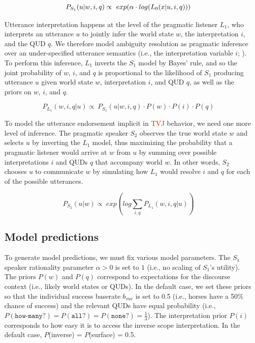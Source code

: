 \documentclass[preprint,authoryear]{elsarticle}\frenchspacing
\newcommand{\lp}[1]{\textcolor{red}{#1}} %
\begin{document}
\begin{equation*}
P_{S_{1}} (u | w, i, q) \propto  \ exp (\alpha \cdot log(L_{0}(x | u, i, q)))\\
\end{equation*}

Utterance interpretation happens at the level of the pragmatic listener $L_1$, who interprets an utterance $u$ to jointly infer the world state $w$, the interpretation $i$, and the QUD $q$. We therefore model ambiguity resolution as pragmatic inference over an under-specified utterance semantics (i.e., the interpretation variable $i$; \citealp{scontrasgoodman2017}). To perform this inference, $L_1$ inverts the $S_1$ model by Bayes' rule, and so the joint probability of $w$, $i$, and $q$ is proportional to the  likelihood of $S_1$ producing utterance $u$ given world state $w$, interpretation $i$, and QUD $q$, as well as the priors on $w$, $i$, and $q$.

\begin{equation*}
 P_{L_{1}} (w, i, q | u) \propto  \ P_{S_{1}} (u | w, i, q) \cdot P(w) \cdot P(i) \cdot P(q)
\end{equation*}

To model the utterance endorsement implicit in 
\lp{TVJ}
behavior, we need one more level of inference. The pragmatic speaker $S_2$ observes the true world state $w$  and selects $u$ by inverting the $L_1$ model, thus maximizing the probability that a pragmatic listener would arrive at $w$ from $u$ by summing over possible interpretations $i$ and QUDs $q$ that accompany world $w$. In other words, $S_2$ chooses $u$ to communicate $w$ by simulating how $L_1$ would resolve $i$ and $q$ for each of the possible utterances.

\begin{equation*}
P_{S_{2}} (u | w) \propto \ exp(log \sum_{i,q} P_{L_{1}} (w, i, q | u))
\end{equation*}

\subsection{Model predictions}

To generate model predictions, we must fix various model parameters. The $S_1$ speaker rationality parameter $\alpha > 0$ is set to $1$ (i.e., no scaling of $S_1$'s utility). The priors $P(w)$ and $P(q)$ correspond to expectations for the discourse context (i.e., likely world states or QUDs). In  the  default  case,  we  set  these  priors  so that the individual success baserate $b_{suc}$ is set to 0.5 (i.e., horses have a 50\% chance of success) and the relevant QUDs have equal probability (i.e., $P(\texttt{how-many?}) = P(\texttt{all?}) = P(\texttt{none?}) = \frac{1}{3}$). The interpretation prior $P(i)$ corresponds to how easy it is to access the inverse scope interpretation. In the default case, $P$(inverse) = $P$(surface) = 0.5.
\end{document}
